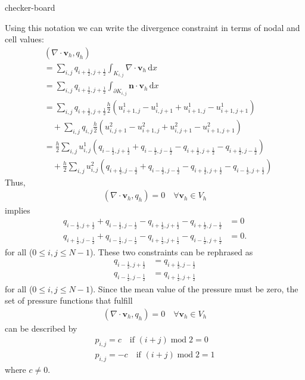 \begin{Problem}{checker-board}
\begin{solution}
Using this notation we can write the divergence constraint in terms of nodal and cell values:
\begin{align*}
 &(\nabla \cdot \boldsymbol{v}_h, q_h)\\
   &= \sum_{i,j} q_{i+\frac12,j+\frac12} \int_{K_{i,j}} \nabla \cdot \boldsymbol{v}_h \,\mathrm{d}x\\
   &= \sum_{i,j} q_{i+\frac12,j+\frac12} \int_{\partial K_{i,j}} \boldsymbol{n} \cdot \boldsymbol{v}_h \,\mathrm{d}x\\
   &= \sum_{i,j} q_{i+\frac12,j+\frac12} \frac{h}{2}(u^1_{i+1,j}-u^1_{i,j+1}+u^1_{i+1,j}-u^1_{i+1,j+1})\\
      &\quad +\sum_{i,j} q_{i,j} \frac{h}{2}(u^2_{i,j+1}-u^2_{i+1,j}+u^2_{i,j+1}-u^2_{i+1,j+1})\\
   &= \frac{h}{2}\sum_{i,j} u^1_{i,j}(q_{i-\frac12,j+\frac12}+q_{i-\frac12,j-\frac12}-q_{i+\frac12,j+\frac12}-q_{i+\frac12,j-\frac12})\\
      &\quad +\frac{h}{2}\sum_{i,j} u^2_{i,j}(q_{i+\frac12,j-\frac12}+q_{i-\frac12,j-\frac12}-q_{i+\frac12,j+\frac12}-q_{i-\frac12,j+\frac12})
\end{align*}
Thus,
\begin{align*}
(\nabla \cdot \boldsymbol{v}_h, q_h)=0 \quad \forall \boldsymbol{v}_h\in V_h
\end{align*}
implies
\begin{align*}
q_{i-\frac12,j+\frac12}+q_{i-\frac12,j-\frac12}-q_{i+\frac12,j+\frac12}-q_{i+\frac12,j-\frac12} &=0 \\
q_{i+\frac12,j-\frac12}+q_{i-\frac12,j-\frac12}-q_{i+\frac12,j+\frac12}-q_{i-\frac12,j+\frac12} &=0.
\end{align*}
for all ($0\leq i,j \leq N-1$).
These two constraints can be rephrased as
\begin{align*}
q_{i-\frac12,j+\frac12} &= q_{i+\frac12,j-\frac12} \\
q_{i-\frac12,j-\frac12} &= q_{i+\frac12,j+\frac12}
\end{align*}
for all ($0\leq i,j \leq N-1$). Since the mean value of the pressure must be zero,
the set of pressure functions that fulfill
\begin{align*}
(\nabla \cdot \boldsymbol{v}_h, q_h)=0 \quad \forall \boldsymbol{v}_h\in V_h
\end{align*}
can be described by
\begin{align*}
 p_{i,j} = c \quad \text{if } (i+j) \operatorname{mod} 2 = 0\\
 p_{i,j} = -c \quad \text{if } (i+j) \operatorname{mod} 2 = 1
\end{align*}
where $c\not=0$.
\end{solution}
\end{Problem}

